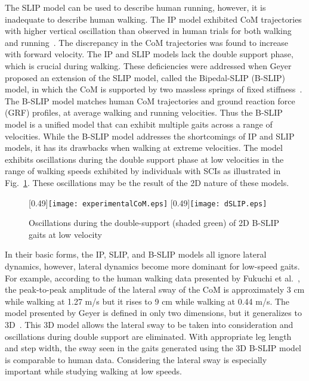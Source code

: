 The SLIP model can be used to describe human running, however, it is inadequate to describe human walking. The IP model exhibited CoM trajectories with higher vertical oscillation than observed in human trials for both walking and running~\cite{lee1998determinants}. The discrepancy in the CoM trajectories was found to increase with forward velocity. The IP and SLIP models lack the double support phase, which is crucial during walking. These deficiencies were addressed when Geyer proposed an extension of the SLIP model, called the Bipedal-SLIP (B-SLIP) model, in which the CoM is supported by two massless springs of fixed stiffness~\cite{geyer2006compliant}. The  B-SLIP model matches human CoM trajectories and ground reaction force (GRF) profiles, at average walking and running velocities. Thus the B-SLIP model is a unified model that can exhibit multiple gaits across a range of velocities. While the B-SLIP model addresses the shortcomings of IP and SLIP models, it has its drawbacks when walking at extreme velocities. The model exhibits oscillations during the double support phase at low velocities in the range of walking speeds exhibited by individuals with SCIs as illustrated in Fig.~\ref{fig:traj_compare}. These oscillations may be the result of the 2D nature of these models.

\begin{figure}
	\centering
	[0.49\textwidth]{\texttt{[image: experimentalCoM.eps]}}%
	\hfill
	[0.49\textwidth]{\texttt{[image: dSLIP.eps]}}%
	\caption{Oscillations during the double-support (shaded green) of 2D B-SLIP gaits at low velocity} \label{fig:traj_compare}
\end{figure}

In their basic forms, the IP, SLIP, and B-SLIP models all ignore lateral dynamics, however, lateral dynamics become more dominant for low-speed gaits. For example, according to the human walking data presented by Fukuchi et al.~\cite{fukuchi2018public}, the peak-to-peak amplitude of the lateral sway of the CoM is approximately 3 cm while walking at 1.27 m/s but it rises to 9 cm while walking at 0.44 m/s. The model presented by Geyer is defined in only two dimensions, but it generalizes to 3D~\cite{liu2015dynamic}. This 3D model allows the lateral sway to be taken into consideration and oscillations during double support are eliminated. With appropriate leg length and step width, the sway seen in the gaits generated using the 3D B-SLIP model is comparable to human data. Considering the lateral sway is especially important while studying walking at low speeds. 

